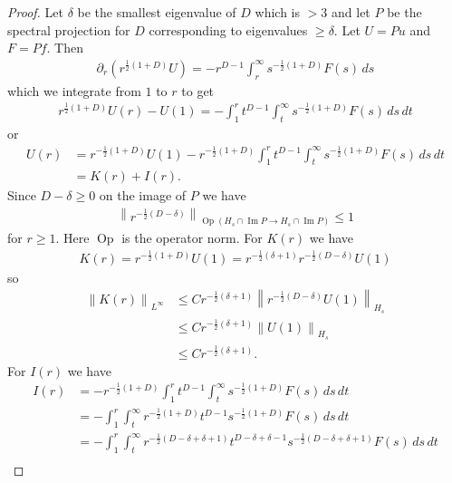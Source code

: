 \documentclass[a4paper,10pt,reqno]{amsart}
\theoremstyle{plain}
\numberwithin{equation}{section}
\begin{document}
\begin{proof}
Let $\delta$ be the smallest eigenvalue of $D$ which is $> 3$ and let $P$ be the spectral projection for $D$ corresponding to eigenvalues $\geq \delta$. Let $U = P u$ and $F = P f$. Then
\begin{align}
\partial_r \left( r^{\frac{1}{2}(1+D)} U \right)
= - r^{D-1} \int_r^\infty s^{-\frac{1}{2}(1+D)} F(s) \, ds 
\end{align}
which we integrate from $1$ to $r$ to get
\begin{align}
r^{\frac{1}{2}(1+D)} U(r) - U(1)
= - 
\int_1^r
t^{D-1} \int_t^\infty s^{-\frac{1}{2}(1+D)} F(s) \, ds 
\, dt
\end{align}
or
\begin{align}
U(r) 
&= r^{- \frac{1}{2}(1+D)}  U(1) 
-  r^{-\frac{1}{2}(1+D)} \int_1^r
t^{D-1} \int_t^\infty s^{-\frac{1}{2}(1+D)} F(s) \, ds 
\, dt \nonumber \\
&= K(r) + I(r).
\end{align}
Since $D - \delta \geq 0$ on the image of $P$ we have
\begin{align}
\left\| r^{-\frac{1}{2} (D - \delta) }
\right\|_{\operatorname{Op}(H_s \cap \operatorname{Im}P
\to H_s \cap \operatorname{Im}P)}
\leq 1
\end{align}
for $r \geq 1$. Here $\operatorname{Op}$ is the operator norm. For $K(r)$ we have 
\begin{align}
K(r) 
= 
r^{- \frac{1}{2}(1+D)}  U(1)  
=
r^{- \frac{1}{2}(\delta + 1)} r^{- \frac{1}{2}(D - \delta)}  U(1)
\end{align}
so
\begin{align}
\left\| K(r) \right\|_{L^\infty} 
&\leq 
C r^{- \frac{1}{2}(\delta + 1)}  
\left\| r^{- \frac{1}{2}(D - \delta)}  U(1) \right\|_{H_s} \nonumber \\
&\leq 
C r^{- \frac{1}{2}(\delta + 1)}
\left\| U(1) \right\|_{H_s} \nonumber \\
&\leq
C r^{- \frac{1}{2}(\delta + 1)}.
\end{align}
For $I(r)$ we have
\begin{align}
I(r)
&=
-r^{-\frac{1}{2}(1+D)} \int_1^r
t^{D-1} \int_t^\infty s^{-\frac{1}{2}(1+D)} F(s) \, ds \, dt \nonumber \\
&= 
- \int_1^r \int_t^\infty 
r^{-\frac{1}{2}(1+D)}
t^{D-1}
s^{-\frac{1}{2}(1+D)} F(s) \, ds \, dt \nonumber \\
&=
- \int_1^r \int_t^\infty 
r^{-\frac{1}{2}(D -\delta + \delta +1)}
t^{D-\delta + \delta-1}
s^{-\frac{1}{2}(D-\delta + \delta+1)} F(s) 
\, ds \, dt \nonumber \\

\end{align}
\end{proof}
\end{document}

